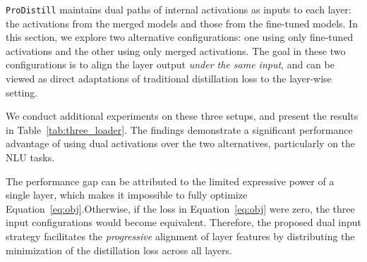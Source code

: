 \texttt{ProDistill} maintains dual paths of internal activations as inputs to each layer: the activations from the merged models and those from the fine-tuned models. In this section, we explore two alternative configurations: one using only fine-tuned activations and the other using only merged activations. 
The goal in these two configurations is to align the layer output \textit{under the same input}, and can be viewed as direct adaptations of traditional distillation loss to the layer-wise setting. 

We conduct additional experiments on these three setups, and present the results in Table~\ref{tab:three_loader}. The findings demonstrate a significant performance advantage of using dual activations over the two alternatives, particularly on the NLU tasks. 

The performance gap can be attributed to the limited expressive power of a single layer, which makes it impossible to fully optimize Equation~\ref{eq:obj}.Otherwise, if the loss in Equation~\ref{eq:obj} were zero, the three input configurations would become equivalent.  Therefore, the proposed dual input strategy facilitates the \textit{progressive} alignment of layer features by distributing the minimization of the distillation loss across all layers.